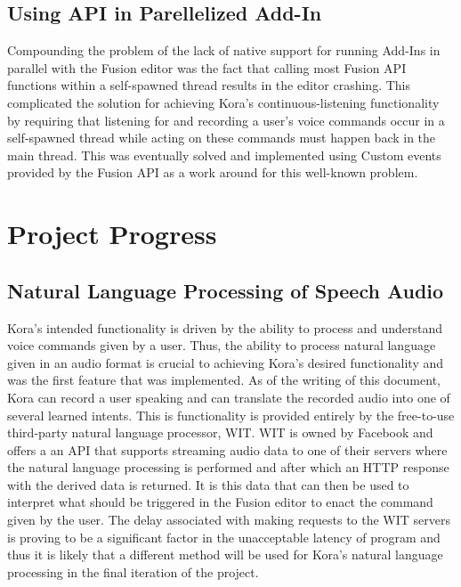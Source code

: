 \documentclass[onecolumn, draftclsnofoot,10pt, compsoc]{IEEEtran}
\begin{document}
    \subsection{Using API in Parellelized Add-In}
    Compounding the problem of the lack of native support for running Add-Ins in parallel with the Fusion editor was the fact that calling most Fusion API functions within a self-spawned thread results in the editor crashing.
    This complicated the solution for achieving Kora’s continuous-listening functionality by requiring that listening for and recording a user’s voice commands occur in a self-spawned thread while acting on these commands must happen back in the main thread.
    This was eventually solved and implemented using Custom events provided by the Fusion API as a work around for this well-known problem.


\section{Project Progress}

	
    \subsection{Natural Language Processing of Speech Audio}
    Kora’s intended functionality is driven by the ability to process and understand voice commands given by a user.
    Thus, the ability to process natural language given in an audio format is crucial to achieving Kora’s desired functionality and was the first feature that was implemented.
    As of the writing of this document, Kora can record a user speaking and can translate the recorded audio into one of several learned intents.
    This is functionality is provided entirely by the free-to-use third-party natural language processor, WIT.
    WIT is owned by Facebook and offers a an API that supports streaming audio data to one of their servers where the natural language processing is performed and after which an HTTP response with the derived data is returned.
    It is this data that can then be used to interpret what should be triggered in the Fusion editor to enact the command given by the user.
    The delay associated with making requests to the WIT servers is proving to be a significant factor in the unacceptable latency of program and thus it is likely that a different method will be used for Kora’s natural language processing in the final iteration of the project.
 
\end{document}
